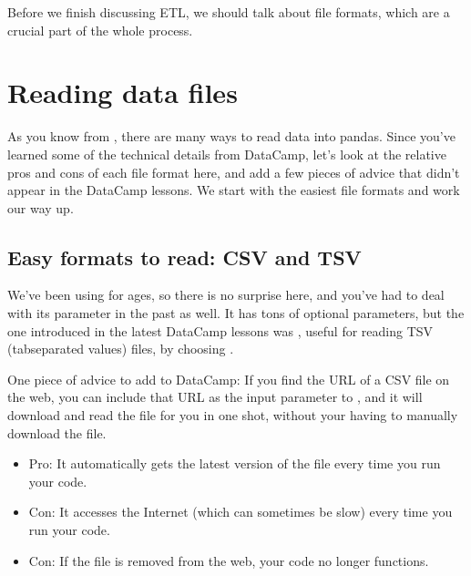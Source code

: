 \documentclass[letterpaper,10pt,english]{sphinxmanual}
\begin{document}
Before we finish discussing ETL, we should talk about file formats, which are a crucial part of the whole process.


\section{Reading data files}
\label{\detokenize{chapter-13-etl:reading-data-files}}
As you know from , there are many ways to read data into pandas.  Since you’ve learned some of the technical details from DataCamp, let’s look at the relative pros and cons of each file format here, and add a few pieces of advice that didn’t appear in the DataCamp lessons.  We start with the easiest file formats and work our way up.


\subsection{Easy formats to read: CSV and TSV}
\label{\detokenize{chapter-13-etl:easy-formats-to-read-csv-and-tsv}}
We’ve been using  for ages, so there is no surprise here, and you’ve had to deal with its  parameter in the past as well.  It has tons of optional parameters, but the one introduced in the latest DataCamp lessons was , useful for reading TSV (tab\sphinxhyphen{}separated values) files, by choosing .

One piece of advice to add to DataCamp:  If you find the URL of a CSV file on the web, you can include that URL as the input parameter to , and it will download and read the file for you in one shot, without your having to manually download the file.
\begin{itemize}
\item {} 
Pro: It automatically gets the latest version of the file every time you run your code.

\item {} 
Con: It accesses the Internet (which can sometimes be slow) every time you run your code.

\item {} 
Con: If the file is removed from the web, your code no longer functions.

\end{itemize}
\end{document}
